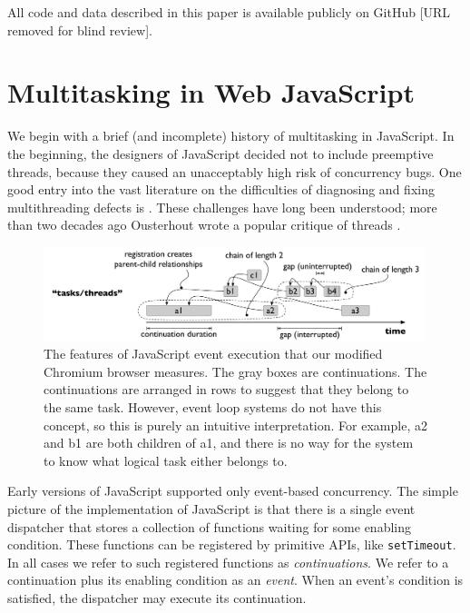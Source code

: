 \documentclass[acmsmall,anonymous,review]{acmart}\settopmatter{printfolios=true,printccs=false,printacmref=false}
\begin{document}
All code and data described in this paper is available publicly on GitHub [URL removed for blind review].

\section{Multitasking in Web JavaScript}

We begin with a brief (and incomplete) history of multitasking in JavaScript.
In the beginning, the designers of JavaScript decided not to include preemptive threads, because they caused an unacceptably high risk of concurrency bugs.
One good entry into the vast literature on the difficulties of diagnosing and fixing multithreading defects is \cite{Lu2008}.
These challenges have long been understood; more than two decades ago Ousterhout wrote a popular critique of threads \cite{Ousterhout1996}.

\begin{figure}
\includegraphics[width=0.99\textwidth]{Figures/continuation_tree}
\caption{The features of JavaScript event execution that our modified Chromium browser measures.
  The gray boxes are continuations.
  The continuations are arranged in rows to suggest that they belong to the same task.
  However, event loop systems do not have this concept, so this is purely an intuitive interpretation.
  For example, \textsf{a2} and \textsf{b1} are both children of \textsf{a1}, and there is no way for the system to know what logical task either belongs to.}
\label{fig:continuation_tree}
\end{figure}

Early versions of JavaScript supported only event-based concurrency.
The simple picture of the implementation of JavaScript is that there is a single event dispatcher that stores a collection of functions waiting for some enabling condition.
These functions can be registered by primitive APIs, like \texttt{setTimeout}.
In all cases we refer to such registered functions as \emph{continuations}.
We refer to a continuation plus its enabling condition as an \emph{event}.
When an event's condition is satisfied, the dispatcher may execute its continuation.
\end{document}
